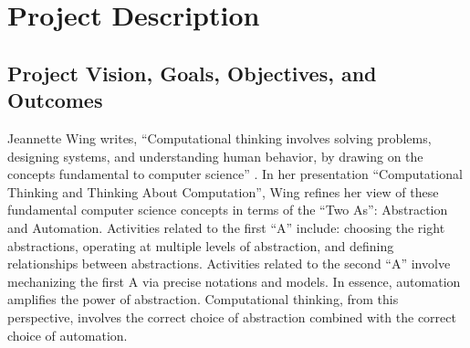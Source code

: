 
\renewcommand{\thepage} {C--\arabic{page}}

\renewcommand{\thesection} {C.\arabic{section}}
\setcounter{section}{0}

\section{Project Description}

\subsection{Project Vision, Goals, Objectives, and Outcomes}



Jeannette Wing writes, ``Computational thinking involves solving
problems, designing systems, and understanding human behavior, by drawing
on the concepts fundamental to computer science'' \citep{Wing06}.  In her
presentation ``Computational Thinking and Thinking About Computation'',
Wing refines her view of these fundamental computer science concepts in terms of 
the ``Two As'': Abstraction and Automation.  Activities
related to the first ``A'' include: choosing the right abstractions, operating
at multiple levels of abstraction, and defining relationships between
abstractions.  Activities related to the second ``A'' involve mechanizing the
first A via precise notations and models.  In essence, automation amplifies
the power of abstraction.  Computational thinking, from this perspective,
involves the correct choice of abstraction combined with the correct choice
of automation.

